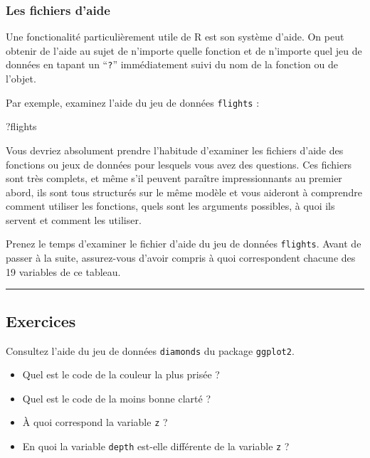 \documentclass[a4paperpaper,]{article}
\newenvironment{Shaded}{\begin{snugshade}}{\end{snugshade}}
\newcommand{\NormalTok}[1]{\textcolor[rgb]{0.12,0.11,0.11}{#1}}
\providecommand{\tightlist}{%
  \setlength{\itemsep}{0pt}\setlength{\parskip}{0pt}}
\begin{document}
\hypertarget{les-fichiers-daide}{%
\subsubsection{Les fichiers d'aide}\label{les-fichiers-daide}}

Une fonctionalité particulièrement utile de R est son système d'aide. On peut obtenir de l'aide au sujet de n'importe quelle fonction et de n'importe quel jeu de données en tapant un ``\texttt{?}'' immédiatement suivi du nom de la fonction ou de l'objet.

Par exemple, examinez l'aide du jeu de données \texttt{flights} :

\begin{Shaded}
\begin{Highlighting}[]
\NormalTok{?flights}
\end{Highlighting}
\end{Shaded}

Vous devriez absolument prendre l'habitude d'examiner les fichiers d'aide des fonctions ou jeux de données pour lesquels vous avez des questions. Ces fichiers sont très complets, et même s'il peuvent paraître impressionnants au premier abord, ils sont tous structurés sur le même modèle et vous aideront à comprendre comment utiliser les fonctions, quels sont les arguments possibles, à quoi ils servent et comment les utiliser.

Prenez le temps d'examiner le fichier d'aide du jeu de données \texttt{flights}. Avant de passer à la suite, assurez-vous d'avoir compris à quoi correspondent chacune des 19 variables de ce tableau.

\begin{center}\rule{0.5\linewidth}{\linethickness}\end{center}

\hypertarget{exercices-1}{%
\subsection{Exercices}\label{exercices-1}}

Consultez l'aide du jeu de données \texttt{diamonds} du package \texttt{ggplot2}.

\begin{itemize}
\tightlist
\item
  Quel est le code de la couleur la plus prisée ?
\item
  Quel est le code de la moins bonne clarté ?
\item
  À quoi correspond la variable \texttt{z} ?
\item
  En quoi la variable \texttt{depth} est-elle différente de la variable \texttt{z} ?
\end{itemize}
\end{document}

